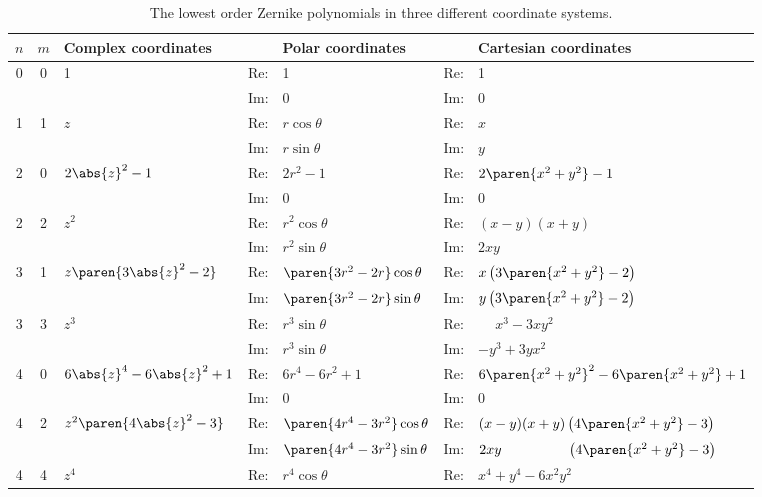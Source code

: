 \begin{sidewaystable}
\caption[The lowest order Zernike polynomials in three different coordinates]{The lowest order Zernike polynomials in three different coordinate systems. }
\begin{center}
{\scriptsize
\begin{tabular}{cclllll}
%
 $n$ & $m$ & Complex coordinates && Polar coordinates && Cartesian coordinates \\\hline
%
 0 & 0 & 1 & Re: & 1 & Re: & 1 \\[2pt]
   &   &   & Im: & 0 & Im: & 0 \\[4pt]
%
  1 & 1 & $z$ & Re: & $r\cos\theta$ & Re: & $x$ \\[2pt]
    &   &     & Im: & $r\sin\theta$ & Im: & $y$ \\[4pt]
%
  2 & 0 & $2\abs{z}^2-1$ 
    & Re: & $2r^{2}-1$ & Re: & $2\paren{x^{2} + y^{2}}-1$ \\[2pt]
    &   &        
    & Im: & 0 & Im: & 0 \\[2pt]
  2 & 2 & $z^{2}$ 
    & Re: & $r^{2}\cos\theta$ & Re: & $(x-y) (x+y)$ \\[2pt]
    &   &         
    & Im: & $r^{2}\sin\theta$ & Im: & $2xy$ \\[4pt]
%
  3 & 1 & $z\paren{3\abs{z}^2-2}$ 
    & Re: & $\paren{3r^{2}-2r}\cos\theta$ 
    & Re: & $x \left(3 \paren{x^2 + y^2} - 2\right)$ \\[2pt]
    &   &         
    & Im: & $\paren{3r^{2}-2r}\sin\theta$ 
    & Im: & $y \left(3 \paren{x^2 + y^2} - 2\right)$ \\[2pt]
  3 & 3 & $z^{3}$ 
    & Re: & $r^{3}\sin\theta$ 
    & Re: & $\phantom{-}x^{3} - 3xy^{2}$ \\[2pt]
    &   &         
    & Im: & $r^{3}\sin\theta$ 
    & Im: & $-y^{3} + 3yx^{2}$ \\[4pt]
%
  4 & 0 & $6\abs{z}^{4}-6\abs{z}^2+1$ & Re: & $6r^{4}-6r^{2}+1$ & Re: & $6\paren{x^{2} + y^{2}}^{2}-6\paren{x^{2} + y^{2}} + 1$ \\[2pt]
    &   &         & Im: & 0 & Im: & 0 \\[2pt]
  4 & 2 & $z^{2}\paren{4\abs{z}^2-3}$ & Re: & $\paren{4r^{4}-3r^{2}}\cos\theta$ 
    & Re: & $(x-y) (x+y) \left(4 \paren{x^2 + y^2}-3\right)$ \\[2pt]
    &   &         
    & Im: & $\paren{4r^{4}-3r^{2}}\sin\theta$& Im: & $2 x y \qquad \qquad \ \ \left(4 \paren{x^2 + y^2}-3\right)$ \\[2pt]
  4 & 4 & $z^{4}$ & Re: & $r^{4}\cos\theta$ & Re: & $x^4+y^4-6 x^2 y^2$ \\[2pt]

\end{tabular}}
\end{center}
\end{sidewaystable}
